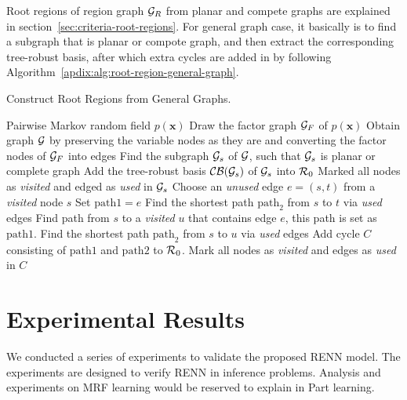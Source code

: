 Root regions of region graph $\mathcal{G}_R$ from planar and compete graphs are explained in section~\ref{sec:criteria-root-regions}. For general graph case, it basically is to find a subgraph that is planar or compote graph, and then extract the corresponding tree-robust basis, after which extra cycles are added in by following Algorithm~\ref{apdix:alg:root-region-general-graph}.
\begin{algorithm}[tb]
  \caption{Construct Root Regions from General Graphs.}
  \label{apdix:alg:root-region-general-graph}
  \begin{algorithmic}
     Pairwise Markov random field $p(\bm{x})$
    \STATE Draw the factor graph $\mathcal{G}_F$ of $p(\bm{x})$
    \STATE Obtain graph $\mathcal{G}$ by preserving the variable nodes as they are and converting the factor nodes of $\mathcal{G}_F$ into edges
    \STATE Find the subgraph $\mathcal{G}_s$ of $\mathcal{G}$, such that $\mathcal{G}_s$ is planar or complete graph
    \STATE Add the tree-robust basis $\mathcal{C}\mathcal{B}(\mathcal{G}_s)$ of $\mathcal{G}_s$ into $\mathcal{R}_0$
    \STATE Marked all nodes as \textit{visited} and edged as \textit{used} in $\mathcal{G}_s$
    \REPEAT
    \STATE Choose an \textit{unused} edge $e = (s,t)$ from a \textit{visited} node $s$
    \STATE Set $\mathrm{path1} = e$
    \STATE Find the shortest path $\mathrm{path}_2$ from $s$ to $t$
    via \textit{used} edges
    \ELSE
    \STATE Find path from $s$ to a \textit{visited} $u$ that
    contains edge $e$, this path is set as $\mathrm{path1}$.
    \STATE Find the shortest path $\mathrm{path}_2$ from $s$ to $u$
    via \textit{used} edges
    \ENDIF
    \STATE Add cycle $C$ consisting of $\mathrm{path1}$ and
    $\mathrm{path2}$ to $\mathcal{R}_0$.
    \STATE Mark all nodes as \textit{visited} and edges as
    \textit{used} in $C$
  \end{algorithmic}
\end{algorithm}





\section{Experimental Results}

We conducted a series of experiments to validate the proposed RENN model. The experiments are designed to verify RENN in inference problems. Analysis and experiments on MRF learning would be reserved to explain in Part learning.



